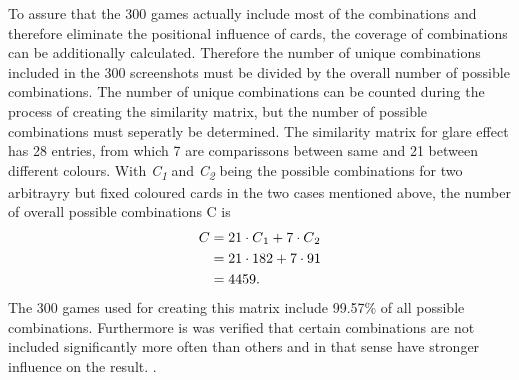 To assure that the 300 games actually include most of the combinations and therefore eliminate the positional influence of cards, the coverage of combinations can be additionally calculated. Therefore the number of unique combinations included in the 300 screenshots must be divided by the overall number of possible combinations. The number of unique combinations can be counted during the process of creating the similarity matrix, but the number of possible combinations must seperatly be determined. The similarity matrix for glare effect has 28 entries, from which 7 are comparissons between same and 21 between different colours. With \textit{C\textsubscript{1}} and \textit{C\textsubscript{2}}  being the possible combinations for two arbitrayry but fixed coloured cards in the two cases mentioned above, the number of overall possible combinations C is
\begin{align*}
	C &= 21 \cdot C\textsubscript{1} + 7 \cdot C\textsubscript{2}\\
	&= 21 \cdot 182 + 7 \cdot 91\\
	&= 4459. 
\end{align*}
The 300 games used for creating this matrix include 99.57\% of all possible combinations. Furthermore is was verified that certain combinations are not included significantly more often than others and in that sense have stronger influence on the result. . 

